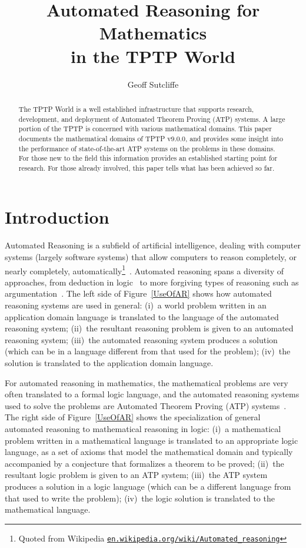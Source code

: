 \documentclass[runningheads]{llncs}
\title{Automated Reasoning for Mathematics \\ in the TPTP World}
\author{
  Geoff Sutcliffe\orcidID{0000-0001-9120-3927}\Envelope
}
\institute{
  University of Miami,
  Miami, USA\\
  \email{geoff@cs.miami.edu}\\
}
\begin{document}
\maketitle

\begin{abstract}
The TPTP World is a well established infrastructure that supports research, development, and 
deployment of Automated Theorem Proving (ATP) systems.
A large portion of the TPTP is concerned with various mathematical domains.
This paper documents the mathematical domains of TPTP v9.0.0, and provides some insight into 
the performance of state-of-the-art ATP systems on the problems in these domains.
For those new to the field this information provides an established starting point for research.
For those already involved, this paper tells what has been achieved so far.
\end{abstract}
\section{Introduction}
\label{Introduction}

Automated Reasoning is a subfield of artificial intelligence, dealing with computer systems
(largely software systems) that allow computers to reason completely, or nearly completely, 
automatically\footnote{%
Quoted from Wikipedia \href{https://en.wikipedia.org/wiki/Automated_reasoning}{{\tt en.wikipedia.org/wiki/Automated\_reasoning}}}~\cite{RV01-HAR}.
Automated reasoning spans a diversity of approaches, from deduction in logic~\cite{Gal15} to more 
forgiving types of reasoning such as argumentation~\cite{vE+14}.
The left side of Figure~\ref{UseOfAR} shows how automated reasoning systems are used in general: 
(i)~a world problem written in an application domain language is translated to the language
of the automated reasoning system; (ii)~the resultant reasoning problem is given to an automated 
reasoning system; (iii)~the automated reasoning system produces a solution (which can be in a
language different from that used for the problem); (iv)~the solution is translated to the 
application domain language.

For automated reasoning in mathematics, the mathematical problems are very often translated to 
a formal logic language, and the automated reasoning systems used to solve the problems are 
Automated Theorem Proving (ATP) systems~\cite{Bun83,RV01-HAR}.
The right side of Figure~\ref{UseOfAR} shows the specialization of general automated reasoning
to mathematical reasoning in logic:
(i)~a mathematical problem written in a mathematical language is translated to an appropriate 
logic language, as a set of axioms that model the mathematical domain and typically accompanied 
by a conjecture that formalizes a theorem to be proved; (ii)~the resultant logic problem is given 
to an ATP system; (iii)~the ATP system produces a solution in a logic language (which can be 
a different language from that used to write the problem); (iv)~the logic solution is translated 
to the mathematical language.
\end{document}
